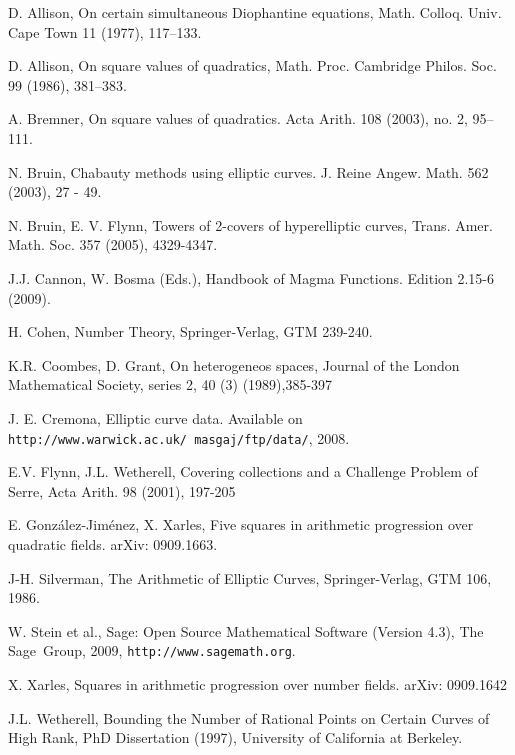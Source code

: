 \documentclass[a4paper,12pt]{amsart}
\theoremstyle{remark}
\theoremstyle{definition}
\begin{document}
\begin{thebibliography}{}

 {\sc D. Allison}, On certain simultaneous Diophantine equations, Math.
Colloq. Univ. Cape Town 11 (1977), 117--133.

 {\sc D. Allison}, On square values of quadratics, Math. Proc. Cambridge
Philos. Soc. 99 (1986), 381--383.

 {\sc A. Bremner}, On square values of quadratics. Acta Arith. 108 (2003), no. 2,
95--111.

 {\sc N. Bruin}, Chabauty methods using elliptic curves. J. Reine Angew. Math. 562 (2003), 27 - 49.

 {\sc N. Bruin, E. V. Flynn}, Towers of 2-covers of hyperelliptic curves, Trans. Amer. Math. Soc. 357 (2005), 4329-4347.

 {\sc J.J. Cannon, W. Bosma (Eds.)}, Handbook of Magma Functions. Edition 2.15-6 (2009).

 {\sc H. Cohen}, Number Theory, Springer-Verlag, GTM
239-240.

 {\sc K.R. Coombes, D. Grant}, On heterogeneos spaces, Journal of the London Mathematical Society, series 2, 40 (3) (1989),385-397

 {\sc J. E. Cremona}, Elliptic curve data.  Available on {\tt http://www.warwick.ac.uk/~masgaj/ftp/data/}, 2008.

 {\sc E.V. Flynn, J.L. Wetherell}, Covering collections and a Challenge Problem of Serre, Acta Arith. 98 (2001), 197-205

  {\sc E. Gonz{\'a}lez-Jim{\'e}nez, X. Xarles}, Five squares in arithmetic progression over quadratic fields. arXiv:
0909.1663.

 {\sc J-H. Silverman}, The Arithmetic of Elliptic Curves, Springer-Verlag, GTM 106, 1986.

 {\sc W. Stein et al.}, Sage: {O}pen {S}ource {M}athematical {S}oftware ({V}ersion 4.3), The  Sage~Group, 2009,
 {\tt http://www.sagemath.org}.

  {\sc X. Xarles}, Squares in arithmetic progression over number fields. arXiv:
0909.1642

 {\sc J.L. Wetherell},  Bounding the Number of Rational Points on Certain Curves of High
Rank, PhD Dissertation (1997), University of California at Berkeley.

\end{thebibliography}
\end{document}
